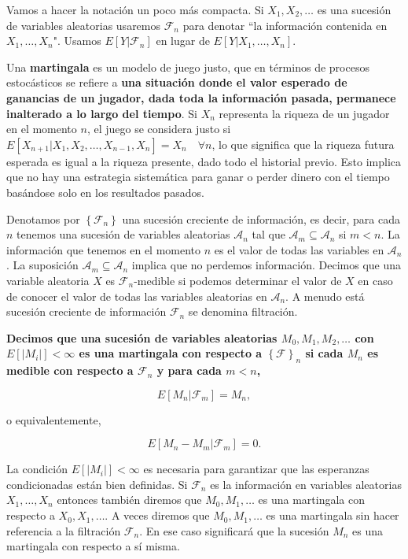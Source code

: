 Vamos a hacer la notación un poco más compacta. Si $X_1, X_2, \ldots$ es una sucesión de variables aleatorias usaremos $\mathcal{F}_n$ para denotar ``la información contenida en $X_1, \ldots, X_n$". Usamos $E[Y | \mathcal{F}_n]$ en lugar de $E[Y | X_1, \ldots, X_n]$.

Una \textbf{martingala} es un modelo de juego justo, que en términos de procesos estocásticos se refiere a \textbf{una situación donde el valor esperado de ganancias de un jugador, dada toda la información pasada, permanece inalterado a lo largo del tiempo}. Si $X_n$ representa la riqueza de un jugador en el momento $n$, el juego se considera justo si $E[X_{n+1} | X_1, X_2, \ldots, X_{n-1}, X_n] = X_n \quad \forall n$, lo que significa que la riqueza futura esperada es igual a la riqueza presente, dado todo el historial previo. Esto implica que no hay una estrategia sistemática para ganar o perder dinero con el tiempo basándose solo en los resultados pasados.

Denotamos por $\left \{ \mathcal{F}_n \right \}$ una sucesión creciente de información, es decir, para cada $n$ tenemos una sucesión de variables aleatorias $\mathcal{A}_n$ tal que $\mathcal{A}_m \subseteq \mathcal{A}_n$ si $m<n$. La información que tenemos en el momento $n$ es el valor de todas las variables en $\mathcal{A}_n$. La suposición $\mathcal{A}_m \subseteq \mathcal{A}_n$ implica que no perdemos información. Decimos que una variable aleatoria $X$ es $\mathcal{F}_n$-medible si podemos determinar el valor de $X$ en caso de conocer el valor de todas las variables aleatorias en $\mathcal{A}_n$. A menudo está sucesión creciente de información $\mathcal{F}_n$ se denomina filtración.

\textbf{Decimos que una sucesión de variables aleatorias $M_0, M_1, M_2, \ldots$ con $E[ |M_i|] < \infty$ es una martingala con respecto a $\left \{ \mathcal{F} \right \} _n$ si cada $M_n$ es medible con respecto a $\mathcal{F}_n$ y para cada $m<n$,}

\begin{equation}\label{eq:martingala}
	E[M_n | \mathcal{F}_m] = M_n,
\end{equation}

o equivalentemente,

\begin{equation}
	E[M_n - M_m |\mathcal{F}_m] = 0.
\end{equation}	

La condición $E[|M_i|] < \infty$ es necesaria para garantizar que las esperanzas condicionadas están bien definidas. Si $\mathcal{F}_n$ es la información en variables aleatorias $X_1, \ldots, X_n$ entonces también diremos que $M_0, M_1, \ldots$ es una martingala con respecto a $X_0, X_1, \ldots$. A veces diremos que $M_0, M_1, \ldots$ es una martingala sin hacer referencia a la filtración $\mathcal{F}_n$. En ese caso significará que la sucesión $M_n$ es una martingala con respecto a sí misma. 


